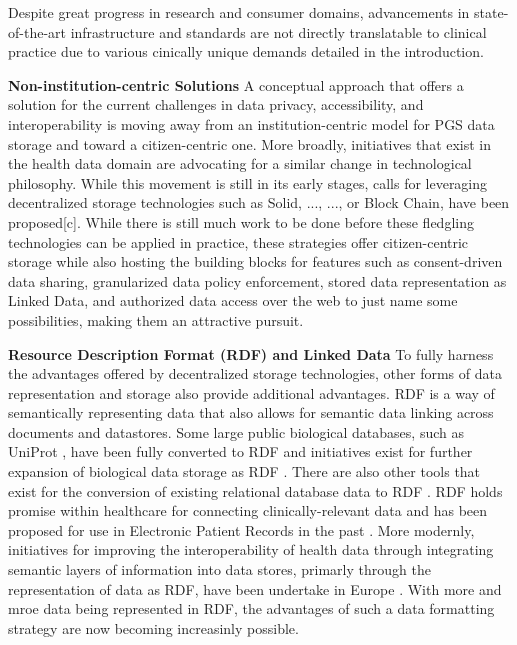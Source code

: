 \documentclass[a4paper,11pt]{article}
\begin{document}
Despite great progress in research and consumer domains, advancements in state-of-the-art infrastructure and standards are not directly translatable to clinical practice due to various cinically unique demands detailed in the introduction. 


\textbf{Non-institution-centric Solutions}
A conceptual approach that offers a solution for the current challenges in data privacy, accessibility, and interoperability is moving away from an institution-centric model for PGS data storage and toward a citizen-centric one. 
More broadly, initiatives that exist in the health data domain are advocating for a similar change in technological philosophy. 
While this movement is still in its early stages, calls for leveraging decentralized storage technologies such as Solid, ..., ..., or Block Chain, have been proposed[c]. 
While there is still much work to be done before these fledgling technologies can be applied in practice, these strategies offer citizen-centric storage while also hosting the building blocks for features such as consent-driven data sharing, granularized data policy enforcement, stored data representation as Linked Data, and authorized data access over the web to just name some possibilities, making them an attractive pursuit. 

\textbf{Resource Description Format (RDF) and Linked Data}
To fully harness the advantages offered by decentralized storage technologies, other forms of data representation and storage also provide additional advantages.
RDF is a way of semantically representing data that also allows for semantic data linking across documents and datastores.
Some large public biological databases, such as UniProt \cite{theuniprotconsortium_uniprot_2017}, have been fully converted to RDF and initiatives exist for further expansion of biological data storage as RDF \cite{sib_swiss_institute_of_bioinformatics_rdf_group_members_sib_2024}.
There are also other tools that exist for the conversion of existing relational database data to RDF \cite{jupp_ebi_2014}.
RDF holds promise within healthcare for connecting clinically-relevant data and has been proposed for use in Electronic Patient Records in the past \cite{lindemann_resource_2008}.
More modernly, initiatives for improving the interoperability of health data through integrating semantic layers of information into data stores, primarly through the representation of data as RDF, have been undertake in Europe \cite{van_der_horst_bridging_2023}.
With more and mroe data being represented in RDF, the advantages of such a data formatting strategy are now becoming increasinly possible.
\end{document}
